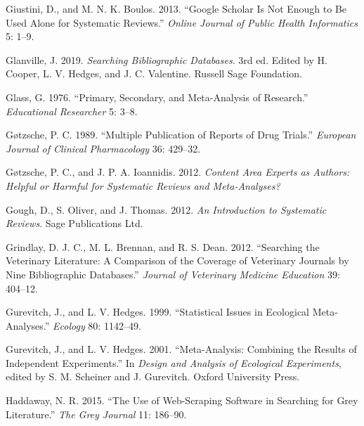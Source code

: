 \documentclass[
  letterpaper,
  DIV=11,
  numbers=noendperiod]{scrreprt}
\newlength{\cslhangindent}
\newenvironment{CSLReferences}[2] %
 {\begin{list}{}{%
  \setlength{\itemindent}{0pt}
  \setlength{\leftmargin}{0pt}
  \setlength{\parsep}{0pt}
  \ifodd #1
   \setlength{\leftmargin}{\cslhangindent}
   \setlength{\itemindent}{-1\cslhangindent}
  \fi
  \setlength{\itemsep}{#2\baselineskip}}}
 {\end{list}}
\begin{document}
\begin{CSLReferences}{1}{1}
Giustini, D., and M. N. K. Boulos. 2013. {``Google Scholar Is Not Enough
to Be Used Alone for Systematic Reviews.''} \emph{Online Journal of
Public Health Informatics} 5: 1--9.

Glanville, J. 2019. \emph{Searching Bibliographic Databases}. 3rd ed.
Edited by H. Cooper, L. V. Hedges, and J. C. Valentine. Russell Sage
Foundation.

Glass, G. 1976. {``Primary, Secondary, and Meta-Analysis of Research.''}
\emph{Educational Researcher} 5: 3--8.

Gøtzsche, P. C. 1989. {``Multiple Publication of Reports of Drug
Trials.''} \emph{European Journal of Clinical Pharmacology} 36: 429--32.

Gøtzsche, P. C., and J. P. A. Ioannidis. 2012. \emph{Content Area
Experts as Authors: Helpful or Harmful for Systematic Reviews and
Meta-Analyses?}

Gough, D., S. Oliver, and J. Thomas. 2012. \emph{An Introduction to
Systematic Reviews}. Sage Publications Ltd.

Grindlay, D. J. C., M. L. Brennan, and R. S. Dean. 2012. {``Searching
the Veterinary Literature: A Comparison of the Coverage of Veterinary
Journals by Nine Bibliographic Databases.''} \emph{Journal of Veterinary
Medicine Education} 39: 404--12.

Gurevitch, J., and L. V. Hedges. 1999. {``Statistical Issues in
Ecological Meta-Analyses.''} \emph{Ecology} 80: 1142--49.

Gurevitch, J., and L. V. Hedges. 2001. {``Meta-Analysis: Combining the
Results of Independent Experiments.''} In \emph{Design and Analysis of
Ecological Experiments}, edited by S. M. Scheiner and J. Gurevitch.
Oxford University Press.

Haddaway, N. R. 2015. {``The Use of Web-Scraping Software in Searching
for Grey Literature.''} \emph{The Grey Journal} 11: 186--90.


\end{CSLReferences}
\end{document}

